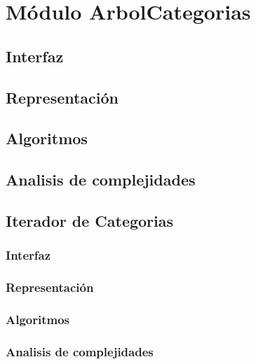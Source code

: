 \documentclass[12pt, a4paper]{article}
\begin{document}
\maketitle
\tableofcontents
\newpage

\section{Módulo ArbolCategorias} 
\subsection{Interfaz}

\subsection{Representaci\'on}

\subsection{Algoritmos}

\subsection{Analisis de complejidades}


\subsection{Iterador de Categorias} 
\subsubsection{Interfaz}

\subsubsection{Representaci\'on}

\subsubsection{Algoritmos}

\subsubsection{Analisis de complejidades}


\newpage
\end{document}
